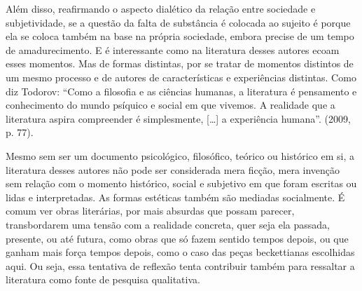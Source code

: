 Além disso, reafirmando o aspecto dialético da relação entre sociedade e
subjetividade, se a questão da falta de substância é colocada ao sujeito
é porque ela se coloca também na base na própria sociedade, embora
precise de um tempo de amadurecimento. E é interessante como na
literatura desses autores ecoam esses momentos. Mas de formas distintas,
por se tratar de momentos distintos de um mesmo processo e de autores de
características e experiências distintas. Como diz Todorov: ``Como a
filosofia e as ciências humanas, a literatura é pensamento e
conhecimento do mundo psíquico e social em que vivemos. A realidade que
a literatura aspira compreender é simplesmente, [\ldots{}] a experiência
humana''. (2009, p. 77).

Mesmo sem ser um documento psicológico, filosófico, teórico ou histórico
em si, a literatura desses autores não pode ser considerada mera ficção,
mera invenção sem relação com o momento histórico, social e subjetivo em que
foram escritas ou lidas e interpretadas. As formas estéticas também são mediadas
socialmente. É comum ver obras literárias, por mais absurdas que possam parecer,
transbordarem uma tensão com a realidade concreta, quer seja ela passada,
presente, ou até futura, como obras que só fazem sentido tempos depois,
ou que ganham mais força tempos depois, como o caso das peças
beckettianas escolhidas aqui. Ou seja, essa tentativa de reflexão tenta
contribuir também para ressaltar a literatura como fonte de pesquisa
qualitativa.

